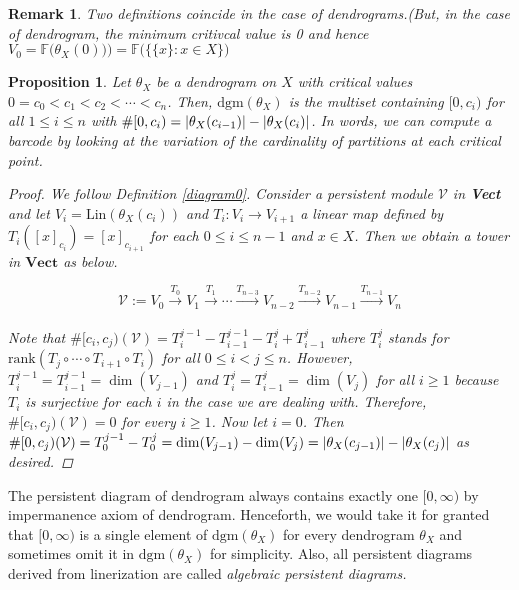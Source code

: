\documentclass[a4paper,12pt]{article}
\newtheorem{remark}{Remark}[section]
\newtheorem{proposition}{Proposition}[section]
\newcommand{\dgm}{\mathrm{dgm}}
\DeclarePairedDelimiter{\abs}{\lvert}{\rvert}
\begin{document}
\begin{remark} Two definitions coincide in the case of dendrograms.(But, in the case of dendrogram, the minimum critivcal value is 0 and hence $V_0=\mathbb{F}\big(\theta_X(0))\big)=\mathbb{F}\Big(\big\{\{x\}: x\in X\big\}\Big)$
\end{remark}

\begin{proposition}
Let $\theta_X$ be a dendrogram on $X$ with critical values $0=c_0<c_1< c_2< \cdots <c_n$.
Then, $\dgm(\theta_X)$ is the multiset containing $[0,c_i)$ for all $1\leq i\leq n$ with $\#[0,c_i)=\abs{\theta_X(c_{i-1})}-\abs{\theta_X(c_i)}$.
In words, we can compute a barcode by looking at the variation of the cardinality of partitions at each critical point. 
\label{dgm2}
 
\begin{proof} We follow Definition \ref{diagram0}. Consider a persistent module $\mathcal{V}$ in \textbf{Vect} and let $V_i=\mathrm{Lin}(\theta_X(c_i))$ and $T_i:V_i\rightarrow V_{i+1}$ a linear map defined by $T_i([x]_{c_i})=[x]_{c_{i+1}}$ for each $0\leq i \leq n-1$ and $x\in X$. Then we obtain a tower in $\mathbf{Vect}$ as below.
 
$$\mathcal{V}:=V_0\xrightarrow[]{T_0}  V_1 \xrightarrow[]{T_1} \cdots \xrightarrow{T_{n-3}} V_{n-2}\xrightarrow{T_{n-2}} V_{n-1} \xrightarrow{T_{n-1}} V_n$$

Note that $\#[c_i,c_j)(\mathcal{V})=T_i^{j-1}-T_{i-1}^{j-1}-T_i^{j}+T_{i-1}^{j}$ where $T_i^j$ stands for $\mathrm{rank}(T_j \circ \cdots \circ T_{i+1}\circ T_i)$ for all $0\leq i < j \leq n$. However, $T_i^{j-1}=T_{i-1}^{j-1}=\dim(V_{j-1})$ and $T_i^{j}=T_{i-1}^{j}=\dim(V_{j})$ for all $i\geq1$ because $T_i$ is surjective for each $i$ in the case we are dealing with. Therefore, $\#[c_i,c_j)(\mathcal{V})=0$ for every $i\geq 1$. Now let $i=0$. Then $\#[0,c_j)(\mathcal{V})=T_0^{j-1}-T_0^{j}=\dim(V_{j-1})-\dim(V_{j})=\abs{\theta_X(c_{j-1})}-\abs{\theta_X(c_{j})}$ as desired.\end{proof}
\end{proposition}

The persistent diagram of dendrogram always contains exactly one $[0,\infty)$ by impermanence axiom of dendrogram. Henceforth, we would take it for granted that $[0,\infty)$ is a single element of $\dgm(\theta_X)$ for every dendrogram $\theta_X$ and sometimes omit it in $\dgm(\theta_X)$ for simplicity. Also, all persistent diagrams derived from linerization are called \emph{algebraic persistent diagrams.}
\end{document}
